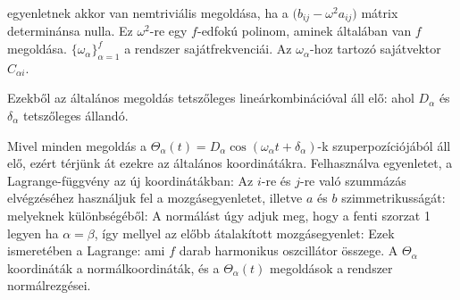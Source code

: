     egyenletnek akkor van nemtriviális megoldása, ha a $\big(b_{ij}- \omega^2 a_{ij}\big)$ mátrix determinánsa nulla. Ez $\omega^2$-re egy $f$-edfokú polinom, aminek általában van $f$ megoldása. $\{\omega_\alpha\}_{\alpha=1}^f$ a rendszer sajátfrekvenciái. Az $\omega_\alpha$-hoz tartozó sajátvektor $C_{\alpha i}$. 
   
   Ezekből az általános megoldás tetszőleges lineárkombinációval áll elő:
   ahol $D_\alpha$ és $\delta_\alpha$ tetszőleges állandó.
   
   Mivel minden megoldás a $\Theta_\alpha(t)=D_\alpha \cos(\omega_\alpha t+\delta_\alpha)$-k szuperpozíciójából áll elő, ezért térjünk át ezekre az általános koordinátákra. Felhasználva  egyenletet, a Lagrange-függvény az új koordinátákban:
   Az $i$-re és $j$-re való szummázás elvégzéséhez használjuk fel a mozgásegyenletet, illetve $a$ és $b$ szimmetrikusságát:
   melyeknek különbségéből:
   A normálást úgy adjuk meg, hogy a fenti szorzat 1 legyen ha $\alpha=\beta$, így
   mellyel az előbb átalakított mozgásegyenlet:
   Ezek ismeretében a Lagrange:
   ami $f$ darab harmonikus oszcillátor összege. A $\Theta_\alpha$ koordináták a normálkoordináták, és a $\Theta_\alpha(t)$ megoldások a rendszer normálrezgései.
   
